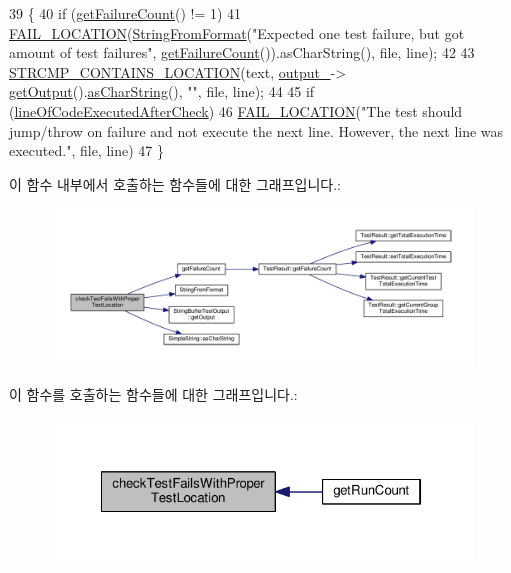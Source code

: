 \begin{DoxyCode}
39 \{
40   \textcolor{keywordflow}{if} (\hyperlink{class_test_testing_fixture_ae19339972571cddf48dfc77c6dcbd000}{getFailureCount}() != 1)
41     \hyperlink{_utest_macros_8h_ae321c9985531a9ad6a47563f7e4b4138}{FAIL\_LOCATION}(\hyperlink{_simple_string_8h_a0699d0e92f0abee2b3bdb9f254f90e51}{StringFromFormat}(\textcolor{stringliteral}{"Expected one test failure, but got %
       amount of test failures"}, \hyperlink{class_test_testing_fixture_ae19339972571cddf48dfc77c6dcbd000}{getFailureCount}()).asCharString(), file, line);
42 
43   \hyperlink{_utest_macros_8h_ada21cc2c59c94d280ec1552b2f2646c1}{STRCMP\_CONTAINS\_LOCATION}(text, \hyperlink{class_test_testing_fixture_a1a9a780805871c30a09c52fe437374fe}{output\_}->
      \hyperlink{class_string_buffer_test_output_a17a31248a362b3190d2b195ba2a9616f}{getOutput}().\hyperlink{class_simple_string_af7c0efaf31f42553f05719903c830be1}{asCharString}(), \textcolor{stringliteral}{""}, file, line);
44 
45   \textcolor{keywordflow}{if} (\hyperlink{class_test_testing_fixture_adbc177067f58e8ba7023e1cdcd830357}{lineOfCodeExecutedAfterCheck})
46     \hyperlink{_utest_macros_8h_ae321c9985531a9ad6a47563f7e4b4138}{FAIL\_LOCATION}(\textcolor{stringliteral}{"The test should jump/throw on failure and not execute the next line.
       However, the next line was executed."}, file, line)
47 \}
\end{DoxyCode}


이 함수 내부에서 호출하는 함수들에 대한 그래프입니다.\+:
\nopagebreak
\begin{figure}[H]
\begin{center}
\leavevmode
\includegraphics[width=350pt]{class_test_testing_fixture_a232fa3da5742200d31d5a514c185e08d_cgraph}
\end{center}
\end{figure}




이 함수를 호출하는 함수들에 대한 그래프입니다.\+:
\nopagebreak
\begin{figure}[H]
\begin{center}
\leavevmode
\includegraphics[width=322pt]{class_test_testing_fixture_a232fa3da5742200d31d5a514c185e08d_icgraph}
\end{center}
\end{figure}


